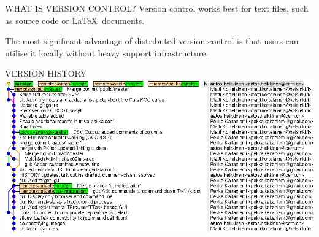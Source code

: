 \documentclass[final,hyperref={pdfpagelabels=false},notitlepage=true]{beamer}
\begin{document}
\begin{frame}{}
\begin{columns}[t]
\begin{column}{0.45\linewidth}
\begin{block}{\large WHAT IS VERSION CONTROL?}
      \vskip1cm
      Version control {\color{orange} works best for} text files, such as {\color{orange} source code} or \LaTeX\ documents.

\vskip1cm
The most significant advantage of distributed version control is that 
users can utilise it locally without heavy support infrastructure.

    \end{block}

    \vskip2cm
    \begin{block}{\large VERSION HISTORY}
      \vskip1cm
      \includegraphics[width=1.0\linewidth]{images/gitk-history-detail.png}
    \end{block}


\end{column}
\end{columns}
\end{frame}
\end{document}
